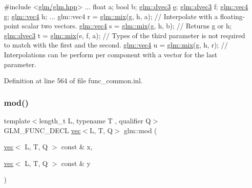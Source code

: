 \begin{DoxyCode}
\textcolor{preprocessor}{#include <\hyperlink{glm_8hpp}{glm/glm.hpp}>}
...
float a;
\textcolor{keywordtype}{bool} b;
\hyperlink{structglm_1_1vec}{glm::dvec3} \hyperlink{group__gtc__constants_ga4b7956eb6e2fbedfc7cf2e46e85c5139}{e};
\hyperlink{structglm_1_1vec}{glm::dvec3} f;
\hyperlink{structglm_1_1vec}{glm::vec4} g;
\hyperlink{structglm_1_1vec}{glm::vec4} h;
...
glm::vec4 r = \hyperlink{group__core__func__common_ga8e93f374aae27d1a88b921860351f8d4}{glm::mix}(g, h, a); \textcolor{comment}{// Interpolate with a floating-point scalar two vectors. }
\hyperlink{structglm_1_1vec}{glm::vec4} s = \hyperlink{group__core__func__common_ga8e93f374aae27d1a88b921860351f8d4}{glm::mix}(g, h, b); \textcolor{comment}{// Returns g or h;}
\hyperlink{structglm_1_1vec}{glm::dvec3} t = \hyperlink{group__core__func__common_ga8e93f374aae27d1a88b921860351f8d4}{glm::mix}(e, f, a); \textcolor{comment}{// Types of the third parameter is not required to
       match with the first and the second.}
\hyperlink{structglm_1_1vec}{glm::vec4} u = \hyperlink{group__core__func__common_ga8e93f374aae27d1a88b921860351f8d4}{glm::mix}(g, h, r); \textcolor{comment}{// Interpolations can be perform per component with a
       vector for the last parameter.}
\end{DoxyCode}
 

Definition at line 564 of file func\+\_\+common.\+inl.

\mbox{\label{group__core__func__common_ga9b197a452cd52db3c5c18bac72bd7798}} 
\subsubsection{\texorpdfstring{mod()}{mod()}}
{\footnotesize\ttfamily template$<$length\+\_\+t L, typename T , qualifier Q$>$ \\
G\+L\+M\+\_\+\+F\+U\+N\+C\+\_\+\+D\+E\+CL \hyperlink{structglm_1_1vec}{vec}$<$L, T, Q$>$ glm\+::mod (\begin{DoxyParamCaption}\item[{\hyperlink{structglm_1_1vec}{vec}$<$ L, T, Q $>$ const \&}]{x,  }\item[{\hyperlink{structglm_1_1vec}{vec}$<$ L, T, Q $>$ const \&}]{y }\end{DoxyParamCaption})}



